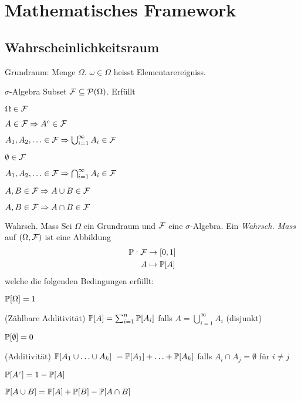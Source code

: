 \section{Mathematisches Framework}%
\label{sec:mathematisches_framework}

\subsection{Wahrscheinlichkeitsraum}%
\label{sub:wahrscheinlichkeitsraum}

Grundraum: Menge $\Omega$. $\omega \in \Omega$ heisst Elementarereigniss.

\begin{definition}{$\sigma$-Algebra}
	Subset $\mathcal{F} \subseteq \mathcal{P} (\Omega)$. Erfüllt
	\begin{properties}
		\item $\Omega \in \mathcal{F}$
		\item $A \in \mathcal{F} \Rightarrow A^c \in \mathcal{F}$
		\item $A_1 , A_2 , \ldots \in \mathcal{F} \Rightarrow \bigcup_{i=1}^\infty A_i \in \mathcal{F}$
		\item $\emptyset \in \mathcal{F}$
		\item $A_1 , A_2 , \ldots \in \mathcal{F} \Rightarrow \bigcap_{i=1}^\infty A_i \in \mathcal{F}$
		\item $A,B \in \mathcal{F} \Rightarrow A \cup B \in \mathcal{F}$
		\item $A,B \in \mathcal{F} \Rightarrow A \cap B \in \mathcal{F}$
	\end{properties}
\end{definition}
\begin{definition}{Wahrsch. Mass}
	Sei $\Omega$ ein Grundraum und $\mathcal{F}$ eine $\sigma$-Algebra. Ein \emph{Wahrsch. Mass} auf $(\Omega, \mathcal{F})$ ist eine
	Abbildung 
	\begin{align*}
		\mathbb{P}: \mathcal{F} & \rightarrow [0,1]\\
		A & \mapsto \mathbb{P}[A]
	\end{align*}
	welche die folgenden Bedingungen erfüllt:
	\begin{properties}
		\item $\mathbb{P} [\Omega] = 1$
		\item (Zählbare Additivität) $\mathbb{P} [A] = \sum^{n}_{i=1} \mathbb{P}[A_i]$ falls $A = \bigcup_{i=1}^\infty A_i$ (disjunkt)
		\item $\mathbb{P} [\emptyset] = 0$
		\item (Additivität) $\pr [A_1 \cup \ldots \cup A_k] = \pr [A_1] + \ldots + \pr [A_k]$ falls $A_i \cap A_j =
			\emptyset$ für $i \neq j$
		\item $\mathbb{P} [A^c] = 1 - \mathbb{P} [A]$
		\item $\mathbb{P} [A \cup B] = \mathbb{P} [A] + \mathbb{P} [B] - \mathbb{P} [A \cap B]$
	\end{properties}
\end{definition}
